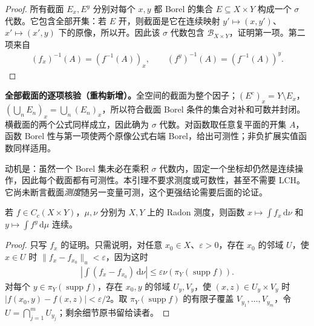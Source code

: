 \documentclass[../../main.tex]{subfiles}
\begin{document}
\begin{proof}
所有截面 $E_x,E^y$ 分别对每个 $x,y$ 都 Borel 的集合 $E\subseteq X\times Y$ 构成一个 $\sigma$ 代数。它包含全部开集：若 $E$ 开，则截面是它在连续映射 $y'\mapsto(x,y')$、$x'\mapsto(x',y)$ 下的原像，所以开。因此该 $\sigma$ 代数包含 $\mathscr B_{X\times Y}$，证明第一项。第二项来自
\begin{align*}
(f_x)^{-1}(A)=(f^{-1}(A))_x,\qquad
(f^y)^{-1}(A)=(f^{-1}(A))^y.
\end{align*}
\end{proof}
\begin{remark}
\textbf{全部截面的逐项核验（重构新增）。}全空间的截面为整个因子；$(E^c)_x=Y\setminus E_x$，$(\bigcup_nE_n)_x=\bigcup_n(E_n)_x$，所以符合截面 Borel 条件的集合对补和可数并封闭。横截面的两个公式同样成立，因此确为 $\sigma$ 代数。对函数取任意复平面的开集 $A$，函数 Borel 性与第一项使两个原像公式右端 Borel，给出可测性；非负扩展实值函数同样适用。

动机是：虽然一个 Borel 集未必在乘积 $\sigma$ 代数内，固定一个坐标却仍然是连续操作，因此每个截面都有可测性。本引理不要求测度或可数性，甚至不需要 LCH。它尚未断言截面\emph{测度}随另一变量可测，这个更强结论需要后面的论证。
\end{remark}
\begin{lemma}\label{lemma:ch07-continuous-partial-integrals}
若 $f\in C_c(X\times Y)$，$\mu,\nu$ 分别为 $X,Y$ 上的 Radon 测度，则函数 $x\mapsto\int f_x\,\mathrm d\nu$ 和 $y\mapsto\int f^y\,\mathrm d\mu$ 连续。
\end{lemma}
\begin{proof}
只写 $f_x$ 的证明。只需说明，对任意 $x_0\in X$、$\varepsilon>0$，存在 $x_0$ 的邻域 $U$，使 $x\in U$ 时 $\|f_x-f_{x_0}\|_u<\varepsilon$，因为这时
\begin{align*}
\left|\int(f_x-f_{x_0})\,\mathrm d\nu\right|
\leqslant\varepsilon\nu(\pi_Y(\operatorname{supp}f)).
\end{align*}
对每个 $y\in\pi_Y(\operatorname{supp}f)$，存在 $x_0,y$ 的邻域 $U_y,V_y$，使 $(x,z)\in U_y\times V_y$ 时 $|f(x_0,y)-f(x,z)|<\varepsilon/2$。取 $\pi_Y(\operatorname{supp}f)$ 的有限子覆盖 $V_{y_1},\ldots,V_{y_m}$，令 $U=\bigcap_{j=1}^mU_{y_j}$；剩余细节原书留给读者。
\end{proof}
\end{document}
